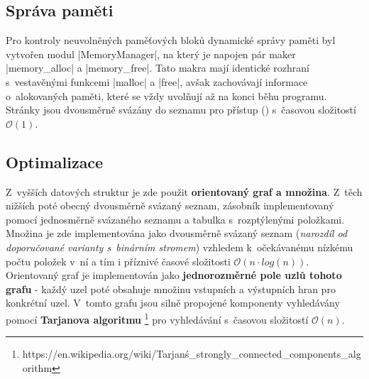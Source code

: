 \subsection{Správa paměti}
Pro kontroly neuvolněných paměťových bloků dynamické správy paměti byl vytvořen modul \ic|MemoryManager|, na který je napojen pár maker \ic|memory_alloc| a \ic|memory_free|. Tato makra mají identické rozhraní s~vestavěnými funkcemi \ic|malloc| a \ic|free|, avšak zachovávají informace o~alokovaných  paměti, které se vždy uvolňují až na konci běhu programu. Stránky jsou dvousměrně svázány do seznamu pro přístup () s~časovou složitostí $\mathcal{O}(1)$.

\subsection{Optimalizace}
Z~vyšších datových struktur je zde použit \textbf{orientovaný graf a množina}. Z~těch nižších poté obecný dvousměrně svázaný seznam, zásobník implementovaný pomocí jednosměrně svázaného seznamu a tabulka s~rozptýlenými položkami. Množina je zde implementována jako dvousměrně svázaný seznam (\emph{narozdíl od doporučované varianty s~binárním stromem}) vzhledem k~očekávanému nízkému počtu položek v~ní a tím i příznivé časové složitosti $\mathcal{O}(n\cdot log(n))$. Orientovaný graf je implementován jako \textbf{jednorozměrné pole uzlů tohoto grafu} - každý uzel poté obsahuje množinu vstupních a výstupních hran pro konkrétní uzel. V~tomto grafu jsou silně propojené komponenty vyhledávány pomocí \textbf{Tarjanova algoritmu} \footnote{https://en.wikipedia.org/wiki/Tarjan\'s\_strongly\_connected\_components\_algorithm} pro vyhledávání s~časovou složitostí $\mathcal{O}(n)$.